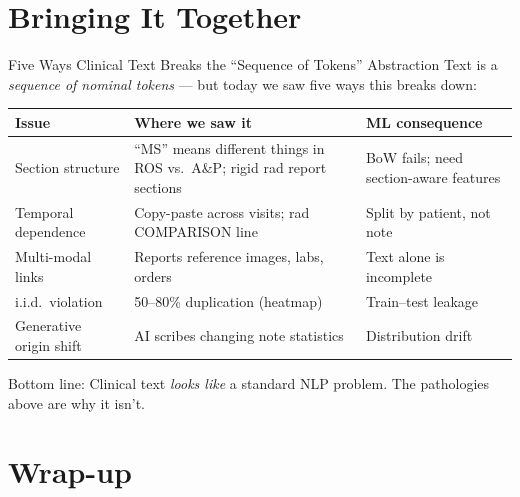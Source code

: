 \documentclass[aspectratio=169,11pt]{beamer}
\begin{document}
\section{Bringing It Together}

\begin{frame}{Five Ways Clinical Text Breaks the ``Sequence of Tokens'' Abstraction}
\small
Text is a \emph{sequence of nominal tokens} --- but today we saw five ways this breaks down:

\vspace{0.05em}
\begin{center}
\scriptsize
\renewcommand{\arraystretch}{1.0}
\begin{tabular}{@{}p{2.2cm}p{4.0cm}p{3.6cm}@{}}
\toprule
\textbf{Issue} & \textbf{Where we saw it} & \textbf{ML consequence} \\
\midrule
Section structure & ``MS'' means different things in ROS vs.\ A\&P; rigid rad report sections & BoW fails; need section-aware features \\
Temporal dependence & Copy-paste across visits; rad COMPARISON line & Split by patient, not note \\
Multi-modal links & Reports reference images, labs, orders & Text alone is incomplete \\
i.i.d.\ violation & 50--80\% duplication (heatmap) & Train--test leakage \\
Generative origin shift & AI scribes changing note statistics & Distribution drift \\
\bottomrule
\end{tabular}
\end{center}
\vspace{-0.1em}
\alert{Bottom line:} Clinical text \emph{looks like} a standard NLP problem. The pathologies above are why it isn't.
\end{frame}

\section{Wrap-up}
\end{document}
